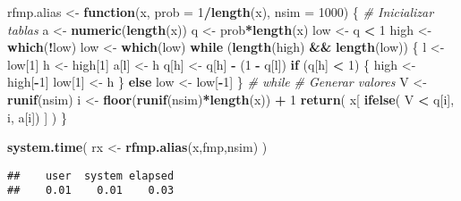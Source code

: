 \documentclass[
]{book}
\newenvironment{Shaded}{\begin{snugshade}}{\end{snugshade}}
\newcommand{\CommentTok}[1]{\textcolor[rgb]{0.56,0.35,0.01}{\textit{#1}}}
\newcommand{\ControlFlowTok}[1]{\textcolor[rgb]{0.13,0.29,0.53}{\textbf{#1}}}
\newcommand{\DataTypeTok}[1]{\textcolor[rgb]{0.13,0.29,0.53}{#1}}
\newcommand{\DecValTok}[1]{\textcolor[rgb]{0.00,0.00,0.81}{#1}}
\newcommand{\KeywordTok}[1]{\textcolor[rgb]{0.13,0.29,0.53}{\textbf{#1}}}
\newcommand{\NormalTok}[1]{#1}
\newcommand{\OperatorTok}[1]{\textcolor[rgb]{0.81,0.36,0.00}{\textbf{#1}}}
\newcommand{\StringTok}[1]{\textcolor[rgb]{0.31,0.60,0.02}{#1}}
\theoremstyle{break}
\theoremstyle{definition}
\theoremstyle{definition}
\theoremstyle{definition}
\theoremstyle{remark}
\begin{document}
\begin{Shaded}
\begin{Highlighting}[]
\NormalTok{rfmp.alias <-}\StringTok{ }\ControlFlowTok{function}\NormalTok{(x, }\DataTypeTok{prob =} \DecValTok{1}\OperatorTok{/}\KeywordTok{length}\NormalTok{(x), }\DataTypeTok{nsim =} \DecValTok{1000}\NormalTok{) \{}
  \CommentTok{# Inicializar tablas}
\NormalTok{  a <-}\StringTok{ }\KeywordTok{numeric}\NormalTok{(}\KeywordTok{length}\NormalTok{(x))}
\NormalTok{  q <-}\StringTok{ }\NormalTok{prob}\OperatorTok{*}\KeywordTok{length}\NormalTok{(x)}
\NormalTok{  low <-}\StringTok{ }\NormalTok{q }\OperatorTok{<}\StringTok{ }\DecValTok{1}
\NormalTok{  high <-}\StringTok{ }\KeywordTok{which}\NormalTok{(}\OperatorTok{!}\NormalTok{low)}
\NormalTok{  low <-}\StringTok{ }\KeywordTok{which}\NormalTok{(low)}
  \ControlFlowTok{while}\NormalTok{ (}\KeywordTok{length}\NormalTok{(high) }\OperatorTok{&&}\StringTok{ }\KeywordTok{length}\NormalTok{(low)) \{}
\NormalTok{    l <-}\StringTok{ }\NormalTok{low[}\DecValTok{1}\NormalTok{]}
\NormalTok{    h <-}\StringTok{ }\NormalTok{high[}\DecValTok{1}\NormalTok{]}
\NormalTok{    a[l] <-}\StringTok{ }\NormalTok{h}
\NormalTok{    q[h] <-}\StringTok{ }\NormalTok{q[h] }\OperatorTok{-}\StringTok{ }\NormalTok{(}\DecValTok{1} \OperatorTok{-}\StringTok{ }\NormalTok{q[l])}
    \ControlFlowTok{if}\NormalTok{ (q[h] }\OperatorTok{<}\StringTok{ }\DecValTok{1}\NormalTok{) \{}
\NormalTok{      high <-}\StringTok{ }\NormalTok{high[}\OperatorTok{-}\DecValTok{1}\NormalTok{]}
\NormalTok{      low[}\DecValTok{1}\NormalTok{] <-}\StringTok{ }\NormalTok{h}
\NormalTok{    \} }\ControlFlowTok{else}\NormalTok{ low <-}\StringTok{ }\NormalTok{low[}\OperatorTok{-}\DecValTok{1}\NormalTok{]}
\NormalTok{  \} }\CommentTok{# while}
  \CommentTok{# Generar valores}
\NormalTok{  V <-}\StringTok{ }\KeywordTok{runif}\NormalTok{(nsim)}
\NormalTok{  i <-}\StringTok{ }\KeywordTok{floor}\NormalTok{(}\KeywordTok{runif}\NormalTok{(nsim)}\OperatorTok{*}\KeywordTok{length}\NormalTok{(x)) }\OperatorTok{+}\StringTok{ }\DecValTok{1}
  \KeywordTok{return}\NormalTok{( x[ }\KeywordTok{ifelse}\NormalTok{( V }\OperatorTok{<}\StringTok{ }\NormalTok{q[i], i, a[i]) ] )}
\NormalTok{\}}


\KeywordTok{system.time}\NormalTok{( rx <-}\StringTok{ }\KeywordTok{rfmp.alias}\NormalTok{(x,fmp,nsim) )}
\end{Highlighting}
\end{Shaded}

\begin{verbatim}
##    user  system elapsed 
##    0.01    0.01    0.03
\end{verbatim}
\end{document}

